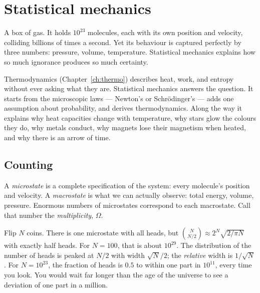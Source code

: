 \chapter{Statistical mechanics}
\label{ch:statmech}



\begin{prototype}
A box of gas. It holds $10^{23}$ molecules, each with its own position and velocity, colliding billions of times a second. Yet its behaviour is captured perfectly by three numbers: pressure, volume, temperature. Statistical mechanics explains how so much ignorance produces so much certainty.
\end{prototype}

Thermodynamics (Chapter~\ref{ch:thermo}) describes heat, work, and entropy without ever asking what they are. Statistical mechanics answers the question. It starts from the microscopic laws --- Newton's or Schr\"odinger's --- adds one assumption about probability, and derives thermodynamics. Along the way it explains why heat capacities change with temperature, why stars glow the colours they do, why metals conduct, why magnets lose their magnetism when heated, and why there is an arrow of time.

\section{Counting}

A \emph{microstate} is a complete specification of the system: every molecule's position and velocity. A \emph{macrostate} is what we can actually observe: total energy, volume, pressure. Enormous numbers of microstates correspond to each macrostate. Call that number the \emph{multiplicity}, $\Omega$.

\begin{example}[Coins]
Flip $N$ coins. There is one microstate with all heads, but $\binom{N}{N/2} \approx 2^N\sqrt{2/\pi N}$ with exactly half heads. For $N=100$, that is about $10^{29}$. The distribution of the number of heads is peaked at $N/2$ with width $\sqrt N/2$; the \emph{relative} width is $1/\sqrt N$. For $N = 10^{23}$, the fraction of heads is $0.5$ to within one part in $10^{11}$, every time you look. You would wait far longer than the age of the universe to see a deviation of one part in a million.
\end{example}

